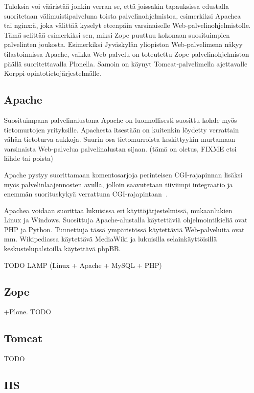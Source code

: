 Tuloksia voi vääristää jonkin verran se, että joissakin tapauksissa
edustalla suoritetaan välimuistipalveluna toista palvelinohjelmistoa,
esimerkiksi Apachea tai nginx:ä, joka välittää kyselyt eteenpäin
varsinaiselle Web-palvelinohjelmistolle. Tämä selittää esimerkiksi
sen, miksi Zope puuttuu kokonaan suosituimpien palvelinten
joukosta. Esimerkiksi Jyväskylän yliopiston Web-palvelimena näkyy
tilastoinnissa Apache, vaikka Web-palvelu on toteutettu
Zope-palvelinohjelmiston päällä suoritettavalla Plonella. Samoin on
käynyt Tomcat-palvelimella ajettavalle Korppi-o\-pin\-to\-tie\-to\-jär\-jes\-tel\-mäl\-le.

\subsection{Apache}

Suosituimpana palvelinalustana Apache on luonnollisesti suosittu kohde
myös tietomurtojen yrityksille. Apachesta itsestään on kuitenkin
löydetty verrattain vähän
tietoturva-aukkoja. Suurin osa tietomurroista
keskittyykin murtamaan varsinaista Web-palvelua palvelinalustan
sijaan. (tämä on oletus, FIXME etsi lähde tai poista)

Apache pystyy suorittamaan komentosarjoja perinteisen CGI-rajapinnan
lisäksi myös palvelinlaajennosten avulla, jolloin saavutetaan
tiiviimpi integraatio ja enemmän suorituskykyä verrattuna
CGI-rajapintaan~\cite{cginopeus}.

Apachea voidaan suorittaa lukuisissa eri käyttöjärjestelmissä,
mukaanlukien Linux ja Windows. Suosittuja Apache-alustalla
käytettäviä ohjelmointikieliä ovat PHP ja Python. Tunnettuja tässä
ympäristössä käytettäviä Web-palveluita ovat mm. Wikipediassa
käytettävä MediaWiki ja lukuisilla selainkäyttöisillä
keskustelupalstoilla käytettävä phpBB.

TODO LAMP (Linux + Apache + MySQL + PHP)

\subsection{Zope}

+Plone. TODO

\subsection{Tomcat}

TODO

\subsection{IIS}

